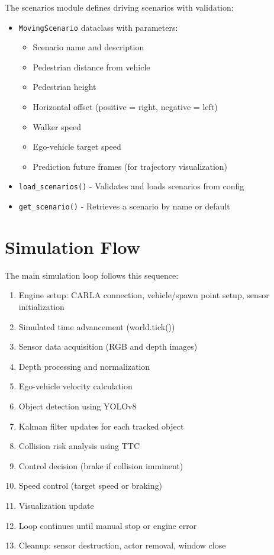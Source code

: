 The scenarios module defines driving scenarios with validation:

\begin{itemize}
    \item \texttt{MovingScenario} dataclass with parameters:
    \begin{itemize}
        \item Scenario name and description
        \item Pedestrian distance from vehicle
        \item Pedestrian height
        \item Horizontal offset (positive = right, negative = left)
        \item Walker speed
        \item Ego-vehicle target speed
        \item Prediction future frames (for trajectory visualization)
    \end{itemize}
    \item \texttt{load\_scenarios()} - Validates and loads scenarios from config
    \item \texttt{get\_scenario()} - Retrieves a scenario by name or default
\end{itemize}

\section{Simulation Flow}

The main simulation loop follows this sequence:

\begin{enumerate}
    \item Engine setup: CARLA connection, vehicle/spawn point setup, sensor initialization
    \item Simulated time advancement (world.tick())
    \item Sensor data acquisition (RGB and depth images)
    \item Depth processing and normalization
    \item Ego-vehicle velocity calculation
    \item Object detection using YOLOv8
    \item Kalman filter updates for each tracked object
    \item Collision risk analysis using TTC
    \item Control decision (brake if collision imminent)
    \item Speed control (target speed or braking)
    \item Visualization update
    \item Loop continues until manual stop or engine error
    \item Cleanup: sensor destruction, actor removal, window close
\end{enumerate}

